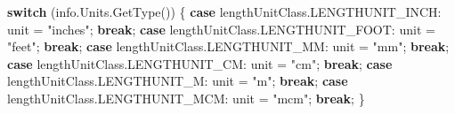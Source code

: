 \documentclass[]{article}
\newenvironment{Shaded}{}{}
\newcommand{\KeywordTok}[1]{\textcolor[rgb]{0.00,0.44,0.13}{\textbf{{#1}}}}
\newcommand{\StringTok}[1]{\textcolor[rgb]{0.25,0.44,0.63}{{#1}}}
\newcommand{\OtherTok}[1]{\textcolor[rgb]{0.00,0.44,0.13}{{#1}}}
\newcommand{\FunctionTok}[1]{\textcolor[rgb]{0.02,0.16,0.49}{{#1}}}
\newcommand{\NormalTok}[1]{{#1}}
\begin{document}
\begin{Shaded}
\begin{Highlighting}[]
      \KeywordTok{switch} \NormalTok{(}\OtherTok{info}\NormalTok{.}\OtherTok{Units}\NormalTok{.}\FunctionTok{GetType}\NormalTok{())}
    \NormalTok{\{}
    \KeywordTok{case} \OtherTok{lengthUnitClass}\NormalTok{.}\FunctionTok{LENGTHUNIT_INCH}\NormalTok{:}
      \NormalTok{unit = }\StringTok{"inches"}\NormalTok{;}
      \KeywordTok{break}\NormalTok{;}
    \KeywordTok{case} \OtherTok{lengthUnitClass}\NormalTok{.}\FunctionTok{LENGTHUNIT_FOOT}\NormalTok{:}
      \NormalTok{unit = }\StringTok{"feet"}\NormalTok{;}
      \KeywordTok{break}\NormalTok{;}
    \KeywordTok{case} \OtherTok{lengthUnitClass}\NormalTok{.}\FunctionTok{LENGTHUNIT_MM}\NormalTok{:}
      \NormalTok{unit = }\StringTok{"mm"}\NormalTok{;}
      \KeywordTok{break}\NormalTok{;}
    \KeywordTok{case} \OtherTok{lengthUnitClass}\NormalTok{.}\FunctionTok{LENGTHUNIT_CM}\NormalTok{:}
      \NormalTok{unit = }\StringTok{"cm"}\NormalTok{;}
      \KeywordTok{break}\NormalTok{;}
    \KeywordTok{case} \OtherTok{lengthUnitClass}\NormalTok{.}\FunctionTok{LENGTHUNIT_M}\NormalTok{:}
      \NormalTok{unit = }\StringTok{"m"}\NormalTok{;}
      \KeywordTok{break}\NormalTok{;}
    \KeywordTok{case} \OtherTok{lengthUnitClass}\NormalTok{.}\FunctionTok{LENGTHUNIT_MCM}\NormalTok{:}
      \NormalTok{unit = }\StringTok{"mcm"}\NormalTok{;}
      \KeywordTok{break}\NormalTok{;}
    \NormalTok{\}}
      
      
      

\end{Highlighting}
\end{Shaded}
\end{document}
